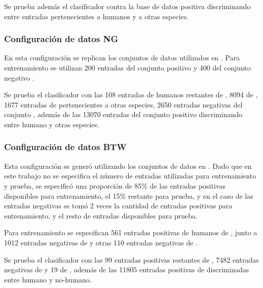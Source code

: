 \documentclass[12pt,bibliography=oldstyle,DIV=12,parskip=half-,titlepage]{scrartcl}
\begin{document}
Se prueba además el clasificador contra la base de datos positiva
 discriminando entre entradas pertenecientes a humanos
y a otras especies.
%
\subsubsection{Configuración de datos NG}
En esta configuración se replican los conjuntos de datos utilizados en
\cite{ng}.  Para entrenamiento se utilizan 200 entradas del conjunto
positivo  y 400 del conjunto negativo .

Se prueba el clasificador con las 108 entradas de humanos restantes de
, 8094 de , 1677 entradas de
 pertenecientes a otras especies, 2650 entradas
negativas del conjunto , además de las 13070
entradas del conjunto positivo  discriminando entre
humano y otras especies.
%
\subsubsection{Configuración de datos BTW}
Esta configuración se generó utilizando los conjuntos de datos en
\cite{batuwita}. Dado que en este trabajo no se especifica el número
de entradas utilizadas para entrenamiento y prueba, se especificó una
proporción de 85\% de las entradas positivas disponibles para
entrenamiento, el 15\% restante para prueba, y en el caso de las
entradas negativas se tomó 2 veces la cantidad de entradas positivas
para entrenamiento, y el resto de entradas disponibles para prueba.

Para entrenamiento se especifican 561 entradas positivas de humanos de
, junto a 1012 entradas negativas de  y
otras 110 entradas negativas de .

Se prueba el clasificador con las 99 entradas positivas restantes de
, 7482 entradas negativas de  y 19 de
, además de las 11805 entradas positivas de
 discriminadas entre humano y no-humano.
\end{document}
